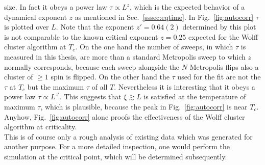     size. In fact it obeys a power law \(\tau \propto L^z\), which is
    the expected behavior of a dynamical exponent \(z\) as mentioned in
    Sec.\ \ref{sssec:eqtime}.
    In Fig.\ \ref{fig:autocorr} \(\tau\) is plotted
    over \(L\). Note that the exponent \(z'=0.64(2)\) determined by this plot is
    not comparable to the known critical exponent \(z=0.25\) \cite{NewmanBarkema1999}
    expected for the Wolff cluster algorithm at \(T_c\). On the one hand the number of sweeps,
    in which \(\tau\) is measured in this thesis, are more than a standard
    Metropolis sweep to which \(z\) normally corresponds, because each sweep
    alongside the \(N\) Metropolis flips also a cluster of \(\ge 1\) spin is
    flipped. On the other hand the \(\tau\) used for the fit are not the
    \(\tau\) at \(T_{c}\) but the maximum \(\tau\) of all \(T\).
    Nevertheless it is interesting that it obeys a power law
    \(\tau \propto L^{z'}\). This suggests that \(\xi \gtrsim L\)
    is satisfied at the temperature of maximum \(\tau\), which is plausible,
    because the peak in Fig.\ \ref{fig:autocorr}
    is near \(T_{c}\).\\
    Anyhow, Fig.\ \ref{fig:autocorr} alone
    proofs the effectiveness of the Wolff cluster algorithm at criticality.\\
    This is of course only a rough analysis of existing data which was
    generated for another purpose. For a more detailed inspection, one
    would perform the simulation at the critical point, which will be
    determined subsequently.

